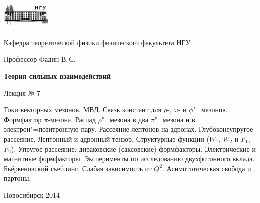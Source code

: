 \documentclass[12pt,pagesize,paper=192mm:108mm]{scrbook}
\begin{document}
\begin{titlepage}
  \vspace*{-1em}
  \begin{center}
    \includegraphics[width=0.18\textwidth]{../NSU-logo}

    Кафедра теоретической физики физического факультета НГУ
    \medskip

    \Large
    Профессор Фадин В.\,С.

    \huge
    \textbf{Теория сильных взаимодействий}
    \smallskip
    
    \Large
    Лекция № 7
    \vfill
    
    \normalsize
    \begin{minipage}{0.78\linewidth}
      Токи векторных мезонов. МВД. Связь констант для $\rho$-,
      $\omega$- и $\phi$"=мезонов. Формфактор $\pi$-мезона. Распад
      $\rho$"=мезона в два $\pi$"=мезона и в электрон"=позитронную
      пару. Рассеяние лептонов на адронах. Глубоконеупругое
      рассеяние. Лептонный и адронный тензор. Структурные функции
      ($W_1$, $W_2$ и $F_1$, $F_2$). Упругое рассеяние: дираковские
      (саксовские) формфакторы. Электрические и магнитные
      формфакторы. Эксперименты по исследованию двухфотонного
      вклада. Бьёркеновский скейлинг. Слабая зависимость от
      $Q^2$. Асимптотическая свобода и партоны.
    \end{minipage}
    \vfill
    
    \normalsize \ccbysa\hspace{0.5em} Новосибирск 2014   
  \end{center}
\end{titlepage}
\end{document}

